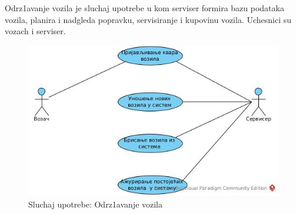 Odrz1avanje vozila je sluchaj upotrebe u kom serviser formira bazu podataka vozila, planira i nadgleda popravku, servisiranje i kupovinu vozila. Uchesnici su vozach i serviser. 

\begin{figure}[h!]
    \includegraphics[scale = 0.45]{Slike/UML/SUodrzavanje.jpg}
    \centering
    \caption{Sluchaj upotrebe: Odrz1avanje vozila}
    \label{odrzavanje vozila}
\end{figure}  

